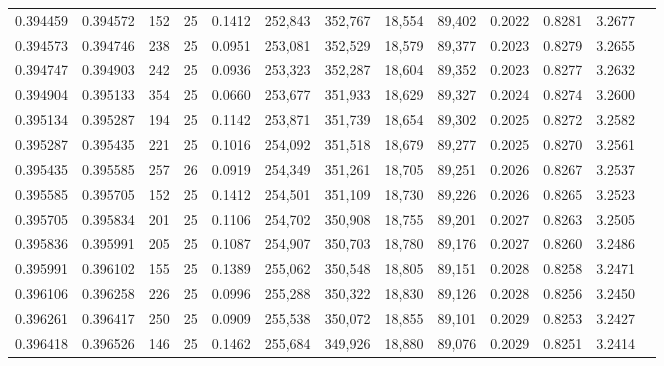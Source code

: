 \begin{tabular}{rrrrrrrrrrrrr}
0.394459 & 0.394572 &   152 &  25 &                                     0.1412 & 252,843 & 352,767 &  18,554 &  89,402 & 0.2022 & 0.8281 & 3.2677 \\
0.394573 & 0.394746 &   238 &  25 &                                     0.0951 & 253,081 & 352,529 &  18,579 &  89,377 & 0.2023 & 0.8279 & 3.2655 \\
0.394747 & 0.394903 &   242 &  25 &                                     0.0936 & 253,323 & 352,287 &  18,604 &  89,352 & 0.2023 & 0.8277 & 3.2632 \\
0.394904 & 0.395133 &   354 &  25 &                                     0.0660 & 253,677 & 351,933 &  18,629 &  89,327 & 0.2024 & 0.8274 & 3.2600 \\
0.395134 & 0.395287 &   194 &  25 &                                     0.1142 & 253,871 & 351,739 &  18,654 &  89,302 & 0.2025 & 0.8272 & 3.2582 \\
0.395287 & 0.395435 &   221 &  25 &                                     0.1016 & 254,092 & 351,518 &  18,679 &  89,277 & 0.2025 & 0.8270 & 3.2561 \\
0.395435 & 0.395585 &   257 &  26 &                                     0.0919 & 254,349 & 351,261 &  18,705 &  89,251 & 0.2026 & 0.8267 & 3.2537 \\
0.395585 & 0.395705 &   152 &  25 &                                     0.1412 & 254,501 & 351,109 &  18,730 &  89,226 & 0.2026 & 0.8265 & 3.2523 \\
0.395705 & 0.395834 &   201 &  25 &                                     0.1106 & 254,702 & 350,908 &  18,755 &  89,201 & 0.2027 & 0.8263 & 3.2505 \\
0.395836 & 0.395991 &   205 &  25 &                                     0.1087 & 254,907 & 350,703 &  18,780 &  89,176 & 0.2027 & 0.8260 & 3.2486 \\
0.395991 & 0.396102 &   155 &  25 &                                     0.1389 & 255,062 & 350,548 &  18,805 &  89,151 & 0.2028 & 0.8258 & 3.2471 \\
0.396106 & 0.396258 &   226 &  25 &                                     0.0996 & 255,288 & 350,322 &  18,830 &  89,126 & 0.2028 & 0.8256 & 3.2450 \\
0.396261 & 0.396417 &   250 &  25 &                                     0.0909 & 255,538 & 350,072 &  18,855 &  89,101 & 0.2029 & 0.8253 & 3.2427 \\
0.396418 & 0.396526 &   146 &  25 &                                     0.1462 & 255,684 & 349,926 &  18,880 &  89,076 & 0.2029 & 0.8251 & 3.2414 \\

\end{tabular}
